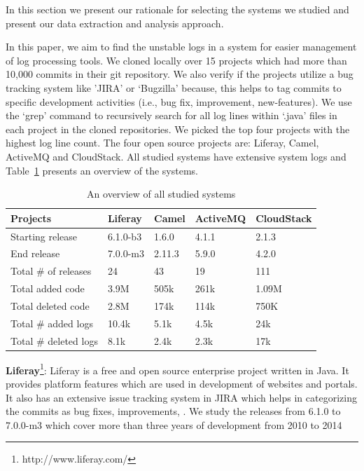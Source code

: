 In this section we present our rationale for selecting the systems we studied and present our data extraction and analysis approach.


In this paper, we aim to find the unstable logs in a system for easier management of log processing tools. We cloned locally over 15 projects which had more than 10,000 commits in their git repository. We also verify if the projects utilize a bug tracking system like 'JIRA' or `Bugzilla' because, this helps to tag commits to specific development activities (i.e., bug fix, improvement, new-features). We use the `grep' command to recursively search for all log lines within `.java' files in each project in the cloned repositories. We picked the top four projects with the highest log line count. The four open source projects are: Liferay, Camel, ActiveMQ and CloudStack. All studied systems have extensive system logs and Table~\ref{tba:overviewsystems} presents an overview of the systems.

\begin{table}[tbh]
\centering \protect\caption{An overview of all studied systems}


\label{tba:overviewsystems} %
\begin{tabular}{lllll}
\hline 
Projects  & Liferay  & Camel  & ActiveMQ  & CloudStack \tabularnewline
\hline 
Starting release  & 6.1.0-b3  & 1.6.0  & 4.1.1  & 2.1.3 \tabularnewline
End release  &7.0.0-m3  & 2.11.3  & 5.9.0  & 4.2.0 \tabularnewline
Total \# of releases   & 24  & 43  & 19 & 111 \tabularnewline
Total added code  & 3.9M  & 505k  & 261k  & 1.09M \tabularnewline
Total deleted code  & 2.8M  & 174k  & 114k  & 750K \tabularnewline
Total \# added logs  & 10.4k  & 5.1k  & 4.5k  & 24k \tabularnewline
Total \# deleted logs  & 8.1k  & 2.4k  & 2.3k  & 17k \tabularnewline
\hline 
\end{tabular}
\end{table}

\textbf{Liferay}\footnote[1]{http://www.liferay.com/}:  Liferay is a free and open source enterprise project written in Java. It provides platform features which are used in development of websites and portals.
  It also has an extensive issue tracking system in JIRA which helps in categorizing the commits as bug fixes, improvements, . We study the releases from 6.1.0 to 7.0.0-m3 which cover more than three years of development from 2010 to 2014


